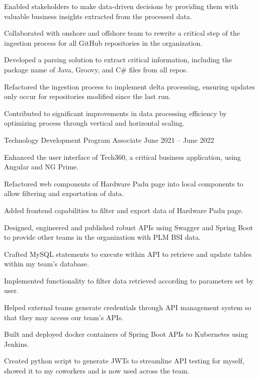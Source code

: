 \begin{cventries}
{\begin{cvitems}
        \item {Enabled stakeholders to make data-driven decisions by providing them with valuable business insights extracted from the processed data.}
        \item {Collaborated with onshore and offshore team to rewrite a critical step of the ingestion process for all GitHub repositories in the organization.}
        \item {Developed a parsing solution to extract critical information, including the package name of Java, Groovy, and C\# files from all repos.}
        \item {Refactored the ingestion process to implement delta processing, ensuring updates only occur for repositories modified since the last run.}
        \item {Contributed to significant improvements in data processing efficiency by optimizing process through vertical and horizontal scaling.}
      \end{cvitems}
    }
  \cventry
    {Technology Development Program Associate} %
    {} %
    {} %
    {June 2021 – June 2022} %
    {
      \begin{cvitems} %
        \item {Enhanced the user interface of Tech360, a critical business application, using Angular and NG Prime.}
        \item {Refactored web components of Hardware Padu page into local components to allow filtering and exportation of data.}
        \item {Added frontend capabilities to filter and export data of Hardware Padu page.}
        \item {Designed, engineered and published robust APIs using Swagger and Spring Boot to provide other teams in the organization with PLM BSI data.}
        \item {Crafted MySQL statements to execute within API to retrieve and update tables within my team's database.}
        \item {Implemented functionality to filter data retrieved according to parameters set by user.}
        \item {Helped external teams generate credentials through API management system so that they may access our team's APIs.}
        \item {Built and deployed docker containers of Spring Boot APIs to Kubernetes using Jenkins.}
        \item {Created python script to generate JWTs to streamline API testing for myself, showed it to my coworkers and is now used across the team.}
      \end{cvitems}
    }

\end{cventries}
